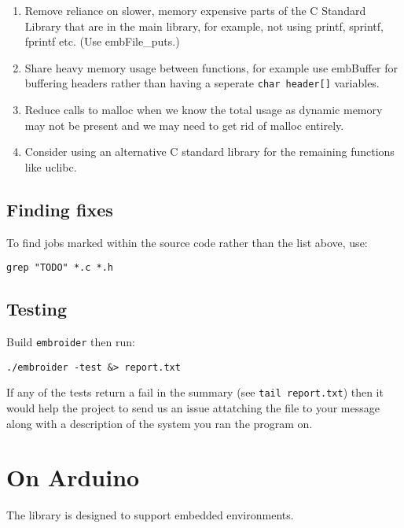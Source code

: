 \documentclass[onesize, a4paper]{refart}
\providecommand{\tightlist}{\setlength{\itemsep}{0pt}\setlength{\parskip}{0pt}}
\begin{document}
\begin{enumerate}
  \begin{enumerate}
  \def\labelenumii{\arabic{enumii}.}
  \tightlist
  \item Remove reliance on slower, memory expensive parts of the C Standard
    Library that are in the main library, for example, not using printf,
    sprintf, fprintf etc. (Use embFile\_puts.)
  \item Share heavy memory usage between functions, for example use
    embBuffer for buffering headers rather than having a seperate
    \texttt{char\ header{[}{]}} variables.
  \item Reduce calls to malloc when we know the total usage as dynamic
    memory may not be present and we may need to get rid of malloc
    entirely.
  \item Consider using an alternative C standard library for the remaining
    functions like uclibc.
  \end{enumerate}
\end{enumerate}

\subsection{Finding fixes}

To find jobs marked within the source code rather than the list above,
use:

\begin{verbatim}
grep "TODO" *.c *.h
\end{verbatim}

\subsection{Testing}

Build \texttt{embroider} then run:

\begin{verbatim}
./embroider -test &> report.txt
\end{verbatim}

If any of the tests return a fail in the summary (see
\texttt{tail\ report.txt}) then it would help the project to send us an
issue attatching the file to your message along with a description of
the system you ran the program on.

\section{On Arduino}

The library is designed to support embedded environments.
\end{document}
